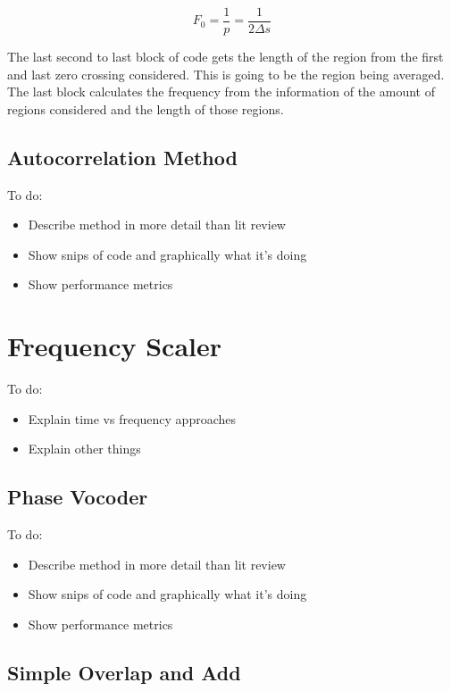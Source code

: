 \begin{equation}\label{eq:PeriodVsFreq1}
	F_0 = \frac{1}{p} = \frac{1}{2\Delta s}
\end{equation}

The last second to last block of code gets the length of the region from the first
and last zero crossing considered. This is going to be the region being averaged.
The last block calculates the frequency from the information of the amount of
regions considered and the length of those regions.

\subsection{Autocorrelation Method}

\color{red}
To do:
\begin{itemize}
	\item Describe method in more detail than lit review
	\item Show snips of code and graphically what it's doing
	\item Show performance metrics
\end{itemize}
\color{black}


\section{Frequency Scaler}

\color{red}
To do:
\begin{itemize}
	\item Explain time vs frequency approaches
	\item Explain other things
\end{itemize}
\color{black}

\subsection{Phase Vocoder}

\color{red}
To do:
\begin{itemize}
	\item Describe method in more detail than lit review
	\item Show snips of code and graphically what it's doing
	\item Show performance metrics
\end{itemize}
\color{black}

\subsection{Simple Overlap and Add}

